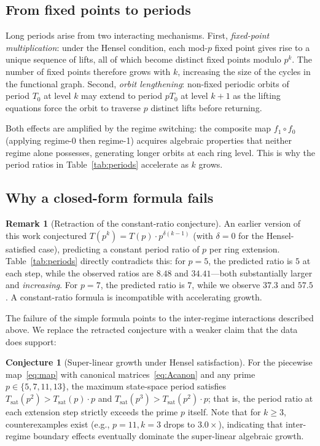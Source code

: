 \documentclass[11pt]{article}
\theoremstyle{plain}
\theoremstyle{definition}
\newtheorem{conjecture}[theorem]{Conjecture}
\newtheorem{remark}[theorem]{Remark}
\begin{document}
\subsection{From fixed points to periods}

Long periods arise from two interacting mechanisms. First, \emph{fixed-point multiplication}: under the Hensel condition, each mod-$p$ fixed point gives rise to a unique sequence of lifts, all of which become distinct fixed points modulo $p^k$. The number of fixed points therefore grows with $k$, increasing the size of the cycles in the functional graph. Second, \emph{orbit lengthening}: non-fixed periodic orbits of period $T_0$ at level $k$ may extend to period $p T_0$ at level $k+1$ as the lifting equations force the orbit to traverse $p$ distinct lifts before returning.

Both effects are amplified by the regime switching: the composite map $f_1 \circ f_0$ (applying regime-0 then regime-1) acquires algebraic properties that neither regime alone possesses, generating longer orbits at each ring level. This is why the period ratios in Table~\ref{tab:periods} accelerate as $k$ grows.

\subsection{Why a closed-form formula fails}

\begin{remark}[Retraction of the constant-ratio conjecture]
An earlier version of this work conjectured $T(p^k) = T(p) \cdot p^{\delta(k-1)}$ (with $\delta = 0$ for the Hensel-satisfied case), predicting a constant period ratio of $p$ per ring extension. Table~\ref{tab:periods} directly contradicts this: for $p=5$, the predicted ratio is $5$ at each step, while the observed ratios are $8.48$ and $34.41$---both substantially larger and \emph{increasing}. For $p=7$, the predicted ratio is $7$, while we observe $37.3$ and $57.5$. A constant-ratio formula is incompatible with accelerating growth.
\end{remark}

The failure of the simple formula points to the inter-regime interactions described above. We replace the retracted conjecture with a weaker claim that the data does support:

\begin{conjecture}[Super-linear growth under Hensel satisfaction]
\label{conj:superlinear}
For the piecewise map~\eqref{eq:map} with canonical matrices~\eqref{eq:Acanon} and any prime $p \in \{5, 7, 11, 13\}$, the maximum state-space period satisfies $T_{\mathrm{sat}}(p^2) > T_{\mathrm{sat}}(p) \cdot p$ and $T_{\mathrm{sat}}(p^3) > T_{\mathrm{sat}}(p^2) \cdot p$; that is, the period ratio at each extension step strictly exceeds the prime $p$ itself.
Note that for $k \ge 3$, counterexamples exist (e.g., $p=11, k=3$ drops to $3.0\times$), indicating that inter-regime boundary effects eventually dominate the super-linear algebraic growth.
\end{conjecture}
\end{document}
